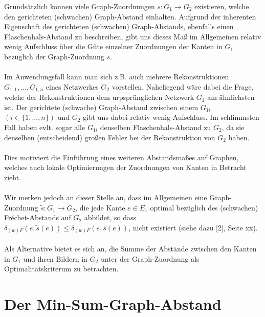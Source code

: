 \documentclass[a4paper, 12pt, twoside]{article}
\theoremstyle{Format1} %
\begin{document}
Grundsätzlich können viele Graph-Zuordnungen $s: G_1 \to G_2$ existieren, welche den gerichteten (schwachen) Graph-Abstand einhalten.
Aufgrund der inherenten Eigenschaft des gerichteten (schwachen) Graph-Abstands, ebenfalls einen Flaschenhals-Abstand zu beschreiben, gibt uns dieses Maß im
Allgemeinen relativ wenig Aufschluss über die Güte einzelner Zuordnungen der Kanten in $G_1$ bezüglich der Graph-Zuordnung $s$.
\\
\\
Im Anwendungsfall kann man sich z.B. auch mehrere Rekonstruktionen $G_{1,1}, ..., G_{1,n}$ eines Netzwerkes $G_2$ vorstellen.
Naheliegend wäre dabei die Frage, welche der Rekonstruktionen dem urpsprünglichen Netzwerk $G_2$ am ähnlichsten ist.
Der gerichtete (schwache) Graph-Abstand zwischen einem $G_{1i}$ $(i \in \{1,...,n\})$ und $G_2$ gibt uns dabei relativ wenig Aufschluss.
Im schlimmsten Fall haben evlt. sogar alle $G_{1i}$ denselben Flaschenhals-Abstand zu $G_2$, da sie denselben (entscheidend) großen Fehler bei der Rekonstruktion von $G_2$ haben.
\\
\\
Dies motiviert die Einführung eines weiteren Abstandsmaßes auf Graphen, welches auch lokale Optimierungen der Zuordnungen von Kanten in Betracht zieht.
\\
\\
Wir merken jedoch an dieser Stelle an, dass im Allgemeinen eine Graph-Zuordnung $\tilde{s}: G_1 \to G_2$, die jede Kante $e \in E_1$ optimal bezüglich des (schwachen)
Fréchet-Abstands auf $G_2$ abbildet, so dass $\delta_{(w)F}(e, \tilde{s}(e)) \leq \delta_{(w)F}(e, s(e))$, nicht existiert (siehe dazu [2], Seite xx).
\\
\\
Als Alternative bietet es sich an, die Summe der Abstände zwischen den Kanten in $G_1$ und ihren Bildern in $G_2$ unter der Graph-Zuordnung als Optimalitätskriterum zu betrachten.

\section{Der Min-Sum-Graph-Abstand}
\end{document}
